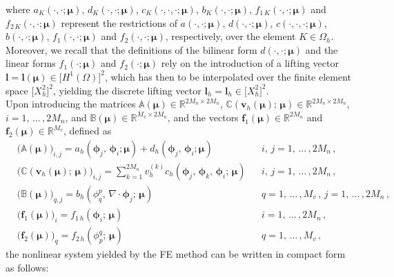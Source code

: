 \documentclass[12pt, a4paper, twoside, openright]{report}
\numberwithin{equation}{chapter}
\theoremstyle{theorem}
\theoremstyle{definition}
\theoremstyle{remark}
\theoremstyle{proposition}
\numberwithin{figure}{chapter}
\newcommand{\bg}[1]{\boldsymbol{#1}}
\begin{document}
		where $a_K(\cdot, \cdot; \bg{\mu})$, $d_K(\cdot, \cdot; \bg{\mu})$, $c_K(\cdot, \cdot, \cdot; \bg{\mu})$, $b_K(\cdot, \cdot; \bg{\mu})$, $f_{1\,K}(\cdot, \cdot; \bg{\mu})$ and $f_{2\,K}(\cdot, \cdot; \bg{\mu})$ represent the restrictions of $a(\cdot, \cdot; \bg{\mu})$, $d(\cdot, \cdot; \bg{\mu})$, $c(\cdot, \cdot, \cdot; \bg{\mu})$, $b(\cdot, \cdot; \bg{\mu})$, $f_{1}(\cdot, \cdot; \bg{\mu})$ and $f_{2}(\cdot, \cdot; \bg{\mu})$, respectively, over the element $K \in \Omega_h$. Moreover, we recall that the definitions of the bilinear form $d(\cdot, \cdot; \bg{\mu})$ and the linear forms $f_1(\cdot; \bg{\mu})$ and $f_2(\cdot; \bg{\mu})$ rely on the introduction of a lifting vector $\bg{l} = \bg{l}(\bg{\mu}) \in \big[ H^1(\Omega) \big]^2$, which has then to be interpolated over the finite element space $\big[ X_h^2 \big]^2$, yielding the discrete lifting vector $\bg{l}_h = \bg{l}_h \in \big[ X_h^2 \big]^2$. \\
		Upon introducing the matrices $\mathbb{A}(\bg{\mu}) \in \mathbb{R}^{2 M_n \times 2 M_n}$, $\mathbb{C}(\mathbf{v}_h(\bg{\mu}); \, \bg{\mu}) \in \mathbb{R}^{2 M_n \times 2 M_n}$, $i = 1, \, \ldots \, , 2 M_n$, and $\mathbb{B}(\bg{\mu}) \in \mathbb{R}^{M_v \times 2 M_n}$, and the vectors $\mathbf{f}_1(\bg{\mu}) \in \mathbb{R}^{2 M_n}$ and $\mathbf{f}_2(\bg{\mu}) \in \mathbb{R}^{M_v}$, defined as
		\begin{subequations}
			\begin{align}
				& \big( \mathbb{A}(\bg{\mu}) \big)_{i,j} = a_h(\bg{\phi}_j, \, \bg{\phi}_i; \bg{\mu}) + d_h(\bg{\phi}_j, \, \bg{\phi}_i; \bg{\mu}) && i, \, j = 1, \, \ldots \, , 2 M_n \, , \\
				& \big( \mathbb{C}(\mathbf{v}_h(\bg{\mu}); \, \bg{\mu}) \big)_{i,j} = \sum_{k = 1}^{2 M_n} v_h^{(k)} c_h(\bg{\phi}_j, \, \bg{\phi}_k, \, \bg{\phi}_i; \, \bg{\mu}) && i, \, j = 1, \, \ldots \, , 2 M_n \, , \\
				\label{eq:B}
				& \big( \mathbb{B}(\bg{\mu}) \big)_{q,j} = b_h(\phi_q^p, \, \nabla \cdot \bg{\phi}_j; \, \bg{\mu}) && q = 1, \, \ldots \, , M_v \, , \, j = 1, \, \ldots \, , 2 M_n \, , \\
				& \big( \mathbf{f}_1(\bg{\mu}) \big)_i = f_{1\,h}(\bg{\phi}_i; \, \bg{\mu}) && i = 1, \, \ldots \, , 2 M_n \, , \\
				& \big( \mathbf{f}_2(\bg{\mu}) \big)_q = f_{2\,h}(\phi_p^q; \, \bg{\mu}) && q = 1, \, \ldots \, , M_v \, ,
			\end{align}
		\end{subequations}
		the nonlinear system yielded by the FE method can be written in compact form as follows:
\end{document}
